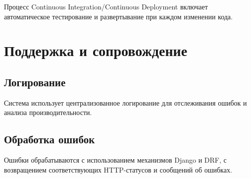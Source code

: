 Процесс Continuous Integration/Continuous Deployment включает
автоматическое тестирование и развертывание при каждом изменении кода.

\hypertarget{ux43fux43eux434ux434ux435ux440ux436ux43aux430-ux438-ux441ux43eux43fux440ux43eux432ux43eux436ux434ux435ux43dux438ux435}{%
\section{Поддержка и
сопровождение}\label{ux43fux43eux434ux434ux435ux440ux436ux43aux430-ux438-ux441ux43eux43fux440ux43eux432ux43eux436ux434ux435ux43dux438ux435}}

\hypertarget{ux43bux43eux433ux438ux440ux43eux432ux430ux43dux438ux435}{%
\subsection*{Логирование}\label{ux43bux43eux433ux438ux440ux43eux432ux430ux43dux438ux435}}

Система использует централизованное логирование для отслеживания ошибок
и анализа производительности.

\hypertarget{ux43eux431ux440ux430ux431ux43eux442ux43aux430-ux43eux448ux438ux431ux43eux43a}{%
\subsection*{Обработка
ошибок}\label{ux43eux431ux440ux430ux431ux43eux442ux43aux430-ux43eux448ux438ux431ux43eux43a}}

Ошибки обрабатываются с использованием механизмов Django и DRF, с
возвращением соответствующих HTTP-статусов и сообщений об ошибках.

\endinput